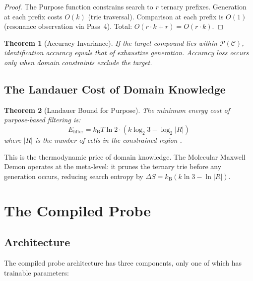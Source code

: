 \documentclass[11pt,twocolumn,a4paper]{article}
\newtheorem{theorem}{Theorem}[section]
\theoremstyle{definition}
\theoremstyle{remark}
\newcommand{\kB}{k_{\mathrm{B}}}
\newcommand{\Purpose}{\mathcal{P}}
\newcommand{\Context}{\mathcal{C}}
\begin{document}
\begin{proof}
The Purpose function constrains search to $r$ ternary prefixes. Generation at each prefix costs $O(k)$ (trie traversal). Comparison at each prefix is $O(1)$ (resonance observation via Pass~4). Total: $O(r \cdot k + r) = O(r \cdot k)$.
\end{proof}

\begin{theorem}[Accuracy Invariance]
\label{thm:accuracy}
If the target compound lies within $\Purpose(\Context)$, identification accuracy equals that of exhaustive generation. Accuracy loss occurs only when domain constraints exclude the target.
\end{theorem}

\subsection{The Landauer Cost of Domain Knowledge}

\begin{theorem}[Landauer Bound for Purpose]
\label{thm:landauer}
The minimum energy cost of purpose-based filtering is:
\begin{equation}
E_{\mathrm{filter}} = \kB T \ln 2 \cdot (k \log_2 3 - \log_2 |R|)
\end{equation}
where $|R|$ is the number of cells in the constrained region \citep{landauer1961}.
\end{theorem}

This is the thermodynamic price of domain knowledge. The Molecular Maxwell Demon \citep{maxwell1871, szilard1929, brillouin1951, zurek2003} operates at the meta-level: it prunes the ternary trie before any generation occurs, reducing search entropy by $\Delta S = \kB(k \ln 3 - \ln|R|)$.

\section{The Compiled Probe}
\label{sec:probe}

\subsection{Architecture}

The compiled probe architecture has three components, only one of which has trainable parameters:
\end{document}
